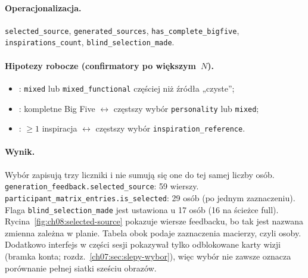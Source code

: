 \paragraph{Operacjonalizacja.}
{\sloppy \texttt{selected\_source}, \texttt{generated\_sources}, \allowbreak\texttt{has\_complete\_bigfive}, \texttt{inspirations\_count}, \allowbreak\texttt{blind\_selection\_made}.\par}

\paragraph{Hipotezy robocze (confirmatory po większym~$N$).}
\begin{itemize}
  \item {}: \texttt{mixed} lub \texttt{mixed\_functional} częściej niż źródła „czyste”;
  \item {}: kompletne Big Five $\leftrightarrow$ częstszy wybór \texttt{personality} lub \texttt{mixed};
  \item {}: $\geq 1$ inspiracja $\leftrightarrow$ częstszy wybór \texttt{inspiration\_reference}.
\end{itemize}

\paragraph{Wynik.}
{\sloppy Wybór zapisują trzy liczniki i nie sumują się one do tej samej liczby osób. \allowbreak\texttt{generation\_feedback.selected\_source}: 59 wierszy. \allowbreak\texttt{participant\_matrix\_entries.is\_selected}: 29 osób (po jednym zaznaczeniu). Flaga \allowbreak\texttt{blind\_selection\_made} jest ustawiona u 17 osób (16 na ścieżce full). Rycina~\ref{fig:ch08:selected-source} pokazuje wiersze feedbacku, bo tak jest nazwana zmienna zależna w planie. Tabela obok podaje zaznaczenia macierzy, czyli osoby. Dodatkowo interfejs w części sesji pokazywał tylko odblokowane karty wizji (bramka konta; rozdz.~\ref{ch07:sec:slepy-wybor}), więc wybór nie zawsze oznacza porównanie pełnej siatki sześciu obrazów.\par}

